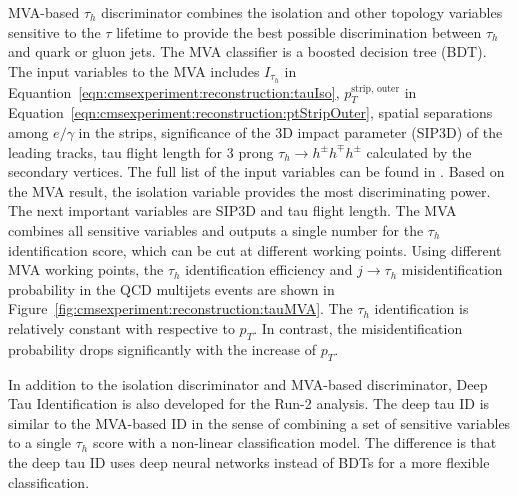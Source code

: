 MVA-based $\tau_h$ discriminator combines the isolation and other topology variables sensitive to the $\tau$ lifetime \cite{Sirunyan:2018pgf} to provide the best possible discrimination between $\tau_h$ and quark or gluon jets. The MVA classifier is a boosted decision tree (BDT). The input variables to the MVA includes $I_{\tau_h}$ in Equantion~\ref{eqn:cmsexperiment:reconstruction:tauIso}, $ p_T^{\text{strip, outer}}$ in Equation~\ref{eqn:cmsexperiment:reconstruction:ptStripOuter}, spatial separations among $e/\gamma$ in the strips, significance of the 3D impact parameter (SIP3D) of the leading tracks, tau flight length for 3 prong $\tau_h \to h^\pm h^\mp h^\pm$ calculated by the secondary vertices. The full list of the input variables can be found in \cite{Chatrchyan:2012zz, Khachatryan:2015dfa}. Based on the MVA result, the isolation variable provides the most discriminating power. The next important variables are SIP3D and tau flight length. The MVA combines all sensitive variables and outputs a single number for the $\tau_h$ identification score, which can be cut at different working points. Using different MVA working points, the $\tau_h$ identification efficiency and $j\to \tau_h$ misidentification probability in the QCD multijets events are shown in Figure~\ref{fig:cmsexperiment:reconstruction:tauMVA}. The $\tau_h$ identification is relatively constant with respective to $p_T$. In contrast, the misidentification probability drops significantly with the increase of $p_T$. 

In addition to the isolation discriminator and MVA-based discriminator, Deep Tau Identification is also developed for the Run-2 analysis. The deep tau ID is similar to the MVA-based ID in the sense of combining a set of sensitive variables to a single $\tau_h$ score with a non-linear classification model. The difference is that the deep tau ID uses deep neural networks instead of BDTs for a more flexible classification. 





